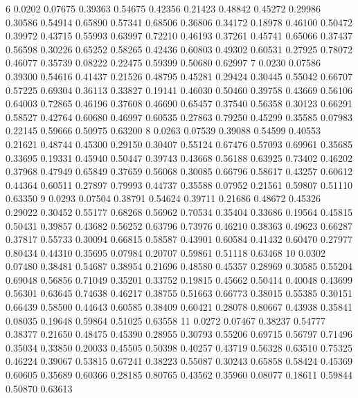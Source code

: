 \documentclass{article}
\begin{document}
\begin{Woutput}
    6      0.0202  0.07675  0.39363  0.54675  0.42356  0.21423  0.48842  0.45272  0.29986  0.30586
                   0.54914  0.65890  0.57341  0.68506  0.36806  0.34172  0.18978  0.46100  0.50472
                   0.39972  0.43715  0.55993  0.63997  0.72210  0.46193  0.37261  0.45741  0.65066
                   0.37437  0.56598  0.30226  0.65252  0.58265  0.42436  0.60803  0.49302  0.60531
                   0.27925  0.78072  0.46077  0.35739  0.08222  0.22475  0.59399  0.50680  0.62997
    7      0.0230  0.07586  0.39300  0.54616  0.41437  0.21526  0.48795  0.45281  0.29424  0.30445
                   0.55042  0.66707  0.57225  0.69304  0.36113  0.33827  0.19141  0.46030  0.50460
                   0.39758  0.43669  0.56106  0.64003  0.72865  0.46196  0.37608  0.46690  0.65457
                   0.37540  0.56358  0.30123  0.66291  0.58527  0.42764  0.60680  0.46997  0.60535
                   0.27863  0.79250  0.45299  0.35585  0.07983  0.22145  0.59666  0.50975  0.63200
    8      0.0263  0.07539  0.39088  0.54599  0.40553  0.21621  0.48744  0.45300  0.29150  0.30407
                   0.55124  0.67476  0.57093  0.69961  0.35685  0.33695  0.19331  0.45940  0.50447
                   0.39743  0.43668  0.56188  0.63925  0.73402  0.46202  0.37968  0.47949  0.65849
                   0.37659  0.56068  0.30085  0.66796  0.58617  0.43257  0.60612  0.44364  0.60511
                   0.27897  0.79993  0.44737  0.35588  0.07952  0.21561  0.59807  0.51110  0.63350
    9      0.0293  0.07504  0.38791  0.54624  0.39711  0.21686  0.48672  0.45326  0.29022  0.30452
                   0.55177  0.68268  0.56962  0.70534  0.35404  0.33686  0.19564  0.45815  0.50431
                   0.39857  0.43682  0.56252  0.63796  0.73976  0.46210  0.38363  0.49623  0.66287
                   0.37817  0.55733  0.30094  0.66815  0.58587  0.43901  0.60584  0.41432  0.60470
                   0.27977  0.80434  0.44310  0.35695  0.07984  0.20707  0.59861  0.51118  0.63468
   10      0.0302  0.07480  0.38481  0.54687  0.38954  0.21696  0.48580  0.45357  0.28969  0.30585
                   0.55204  0.69048  0.56856  0.71049  0.35201  0.33752  0.19815  0.45662  0.50414
                   0.40048  0.43699  0.56301  0.63645  0.74638  0.46217  0.38755  0.51663  0.66773
                   0.38015  0.55385  0.30151  0.66439  0.58500  0.44643  0.60585  0.38409  0.60421
                   0.28078  0.80667  0.43938  0.35841  0.08035  0.19648  0.59864  0.51025  0.63558
   11      0.0272  0.07467  0.38237  0.54777  0.38377  0.21650  0.48475  0.45390  0.28955  0.30793
                   0.55206  0.69715  0.56797  0.71496  0.35034  0.33850  0.20033  0.45505  0.50398
                   0.40257  0.43719  0.56328  0.63510  0.75325  0.46224  0.39067  0.53815  0.67241
                   0.38223  0.55087  0.30243  0.65858  0.58424  0.45369  0.60605  0.35689  0.60366
                   0.28185  0.80765  0.43562  0.35960  0.08077  0.18611  0.59844  0.50870  0.63613


\end{Woutput}
\end{document}
